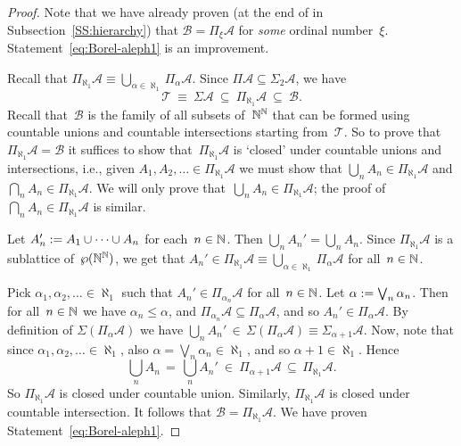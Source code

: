 \begin{proof}
Note that we have already proven 
(at the end of
in Subsection~\ref{SS:hierarchy})
 that $\mathcal{B} = \Pi_\xi \mathcal{A}$
for \emph{some} ordinal number~$\xi$.
Statement~\eqref{eq:Borel-aleph1}
is an improvement.

Recall that $\Pi_{\aleph_1}\mathcal{A}
\equiv \bigcup_{\alpha\in\aleph_1} \Pi_\alpha \mathcal{A}$.
Since $\Pi \mathcal{A} \subseteq \Sigma_2 \mathcal{A}$,
we have
\begin{equation*}
\mathcal{T} \ \equiv\  \Sigma \mathcal{A} 
\ \subseteq\  \Pi_{\aleph_1}\mathcal{A}\ \subseteq\ \mathcal{B}.
\end{equation*}
Recall that~$\mathcal{B}$
is the family of all subsets of~$\mathbb{N}^{\mathbb{N}}$
that can be formed using countable unions and countable intersections
starting from~$\mathcal{T}$.
So to prove that $\Pi_{\aleph_1}\mathcal{A} = \mathcal{B}$
it suffices
to show that~$\Pi_{\aleph_1}\mathcal{A}$
is `closed' under countable unions and  intersections,
i.e.,
given $A_1,A_2,\dotsc \in \Pi_{\aleph_1}\mathcal{A}$
we must show that  $\bigcup_n A_n \in \Pi_{\aleph_1}\mathcal{A}$
and  $\bigcap_n A_n \in \Pi_{\aleph_1}\mathcal{A}$.
We will only prove that~$\bigcup_n A_n \in \Pi_{\aleph_1}\mathcal{A}$;
the proof of~$\bigcap_n A_n \in \Pi_{\aleph_1}\mathcal{A}$
is similar.

Let $A_n' := A_1 \cup \dotsb \cup A_n$
for each~$n\in\mathbb{N}$.
Then $\bigcup_n A_n' = \bigcup_n A_n$.
Since $\Pi_{\aleph_1}\mathcal{A}$
is a sublattice of~$\wp(\mathbb{N}^{\mathbb{N}})$,
we get that 
$A_n'\in \Pi_{\aleph_1}\mathcal{A}
\equiv\bigcup_{\alpha\in\aleph_1}\Pi_{\alpha}\mathcal{A}$
for all~$n\in\mathbb{N}$.

Pick $\alpha_1,\alpha_2,\dotsc \in \aleph_1$
such that $A_n' \in \Pi_{\alpha_n} \mathcal{A}$
for all~$n\in\mathbb{N}$.
Let $\alpha:= \bigvee_n \alpha_n$.
Then 
for all~$n\in\mathbb{N}$ we have $\alpha_n \leq \alpha$,
and  $\Pi_{\alpha_n} \mathcal{A} \subseteq \Pi_{\alpha}\mathcal{A}$,
and so $A_n'\in\Pi_{\alpha}\mathcal{A}$.
By definition of 
$ \Sigma(\Pi_{\alpha}\mathcal{A})$
we have $\bigcup_n A_n' \,\in\,
\Sigma(\Pi_{\alpha}\mathcal{A})\equiv\Sigma_{\alpha+1}\mathcal{A}$.
Now, note that since $\alpha_1,\alpha_2,\dotsc \in\aleph_1$,
also $\alpha=\bigvee_n \alpha_n \in \aleph_1$,
and so $\alpha+1 \in\aleph_1$.
Hence 
\begin{equation*}
\textstyle{\bigcup_n A_n \,=\,  \bigcup_n A_n' 
\ \in\  \Pi_{\alpha+1}\mathcal{A}
\,\subseteq\, \Pi_{\aleph_1}\mathcal{A}.}
\end{equation*}
So $\Pi_{\aleph_1} \mathcal{A}$
is closed under countable union.
Similarly, $\Pi_{\aleph_1} \mathcal{A}$
is closed under countable intersection.
It follows that  $\mathcal{B} = \Pi_{\aleph_1}\mathcal{A}$.
We have proven Statement~\eqref{eq:Borel-aleph1}.
\end{proof}

